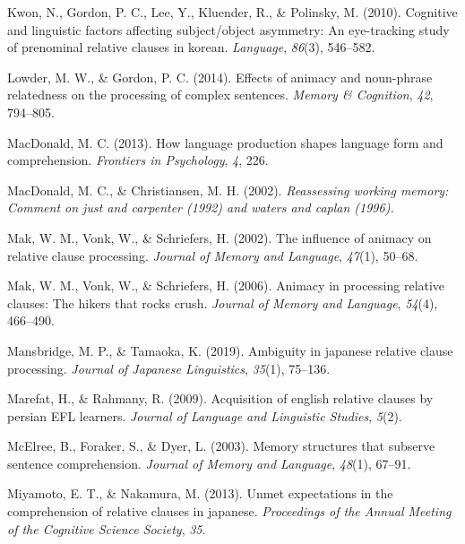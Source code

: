 \documentclass[
]{article}
\newlength{\cslhangindent}
\newenvironment{CSLReferences}[2] %
 {\begin{list}{}{%
  \setlength{\itemindent}{0pt}
  \setlength{\leftmargin}{0pt}
  \setlength{\parsep}{0pt}
  \ifodd #1
   \setlength{\leftmargin}{\cslhangindent}
   \setlength{\itemindent}{-1\cslhangindent}
  \fi
  \setlength{\itemsep}{#2\baselineskip}}}
 {\end{list}}
\begin{document}
\begin{CSLReferences}{1}{0}
Kwon, N., Gordon, P. C., Lee, Y., Kluender, R., \& Polinsky, M. (2010).
Cognitive and linguistic factors affecting subject/object asymmetry: An
eye-tracking study of prenominal relative clauses in korean.
\emph{Language}, \emph{86}(3), 546--582.

Lowder, M. W., \& Gordon, P. C. (2014). Effects of animacy and
noun-phrase relatedness on the processing of complex sentences.
\emph{Memory \& Cognition}, \emph{42}, 794--805.

MacDonald, M. C. (2013). How language production shapes language form
and comprehension. \emph{Frontiers in Psychology}, \emph{4}, 226.

MacDonald, M. C., \& Christiansen, M. H. (2002). \emph{Reassessing
working memory: Comment on just and carpenter (1992) and waters and
caplan (1996).}

Mak, W. M., Vonk, W., \& Schriefers, H. (2002). The influence of animacy
on relative clause processing. \emph{Journal of Memory and Language},
\emph{47}(1), 50--68.

Mak, W. M., Vonk, W., \& Schriefers, H. (2006). Animacy in processing
relative clauses: The hikers that rocks crush. \emph{Journal of Memory
and Language}, \emph{54}(4), 466--490.

Mansbridge, M. P., \& Tamaoka, K. (2019). Ambiguity in japanese relative
clause processing. \emph{Journal of Japanese Linguistics}, \emph{35}(1),
75--136.

Marefat, H., \& Rahmany, R. (2009). Acquisition of english relative
clauses by persian EFL learners. \emph{Journal of Language and
Linguistic Studies}, \emph{5}(2).

McElree, B., Foraker, S., \& Dyer, L. (2003). Memory structures that
subserve sentence comprehension. \emph{Journal of Memory and Language},
\emph{48}(1), 67--91.

Miyamoto, E. T., \& Nakamura, M. (2013). Unmet expectations in the
comprehension of relative clauses in japanese. \emph{Proceedings of the
Annual Meeting of the Cognitive Science Society}, \emph{35}.


\end{CSLReferences}
\end{document}
